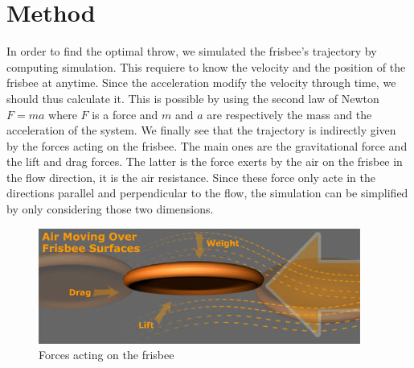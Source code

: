 \documentclass[10pt,a4paper]{report}
\begin{document}
\section{Method}
In order to find the optimal throw, we simulated the frisbee's trajectory by computing simulation. This requiere to know the velocity and the position of the frisbee at anytime. Since the acceleration modify the velocity through time, we should thus calculate it. This is possible by using the second law of Newton $F = ma$ where $F$ is a force and $m$ and $a$ are respectively the mass and the acceleration of the system. We finally see that the trajectory is indirectly given by the forces acting on the frisbee. The main ones are the gravitational force and the lift and drag forces. The latter is the force exerts by the air on the frisbee in the flow direction, it is the air resistance. Since these force only acte in the directions parallel and perpendicular to the flow, the simulation can be simplified by only considering those two dimensions.

\begin{figure}[h]
\centering
\includegraphics[scale=0.8]{forces.jpg}
\caption{Forces acting on the frisbee}
\label{Forces acting on the frisbee}
\end{figure}
\end{document}
